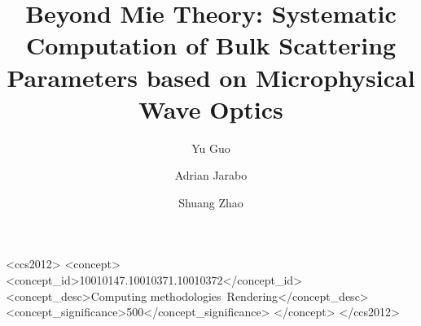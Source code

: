\documentclass[acmtog]{acmart}
\title{Beyond Mie Theory: Systematic Computation of Bulk Scattering Parameters based on Microphysical Wave Optics}
\author{Yu Guo}
\affiliation{
	\institution{University of California, Irvine}
	\country{USA}}
\author{Adrian Jarabo}
\affiliation{
	\institution{Universidad de Zaragoza - I3A}
	\country{Spain}}
\author{Shuang Zhao}
\affiliation{
	\institution{University of California, Irvine}
	\country{USA}}
\begin{document}
    
    

	\begin{CCSXML}
		<ccs2012>
			<concept>
				<concept_id>10010147.10010371.10010372</concept_id>
				<concept_desc>Computing methodologies~Rendering</concept_desc>
				<concept_significance>500</concept_significance>
			</concept>
		</ccs2012>
	\end{CCSXML}


    
    \maketitle
    
    
    
    
    
    
    
    
    

    
    

    \clearpage
    \appendix
    
\end{document}
